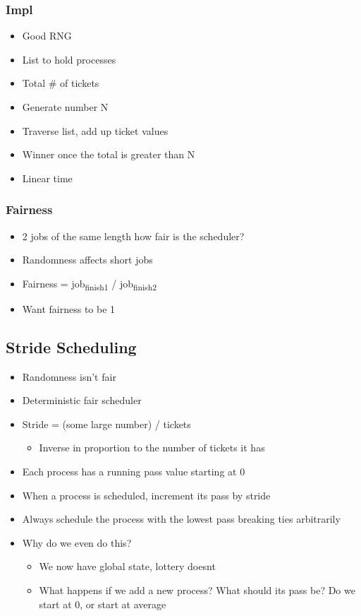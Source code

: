 \documentclass[11pt]{article}
\begin{document}
\subsubsection{Impl}
\label{sec:orge3532a6}
\begin{itemize}
\item Good RNG
\item List to hold processes
\item Total \# of tickets

\item Generate number N
\item Traverse list, add up ticket values
\item Winner once the total is greater than N

\item Linear time
\end{itemize}
\subsubsection{Fairness}
\label{sec:org3ceb002}
\begin{itemize}
\item 2 jobs of the same length how fair is the scheduler?
\item Randomness affects short jobs
\item Fairness = job\textsubscript{finish}\textsubscript{1} / job\textsubscript{finish}\textsubscript{2}
\item Want fairness to be 1
\end{itemize}
\subsection{Stride Scheduling}
\label{sec:org5344723}
\begin{itemize}
\item Randomness isn't fair
\item Deterministic fair scheduler
\item Stride = (some large number) / tickets
\begin{itemize}
\item Inverse in proportion to the number of tickets it has
\end{itemize}
\item Each process has a running pass value starting at 0
\item When a process is scheduled, increment its pass by stride
\item Always schedule the process with the lowest pass breaking ties arbitrarily

\item Why do we even do this?
\begin{itemize}
\item We now have global state, lottery doesnt
\item What happens if we add a new process? What should its pass be? Do we start at 0, or start at average
\end{itemize}
\end{itemize}
\end{document}
